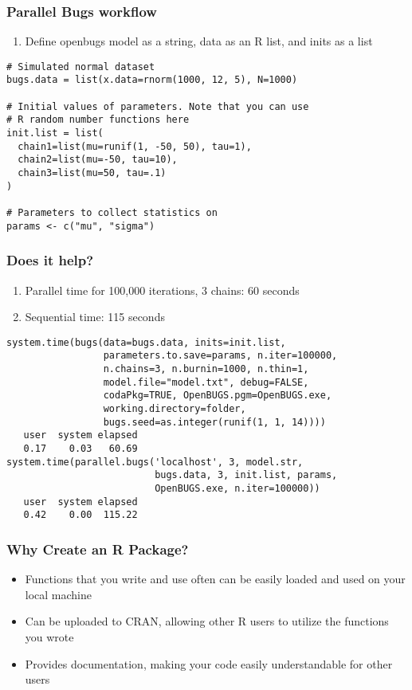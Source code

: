 \documentclass{beamer}
\begin{document}
\begin{frame}[fragile]
  \frametitle{Parallel Bugs workflow}
  
  \begin{enumerate}
    \item Define openbugs model as a string, data as an R list, and inits as a list
  \end{enumerate}

  \begin{verbatim}
# Simulated normal dataset
bugs.data = list(x.data=rnorm(1000, 12, 5), N=1000)

# Initial values of parameters. Note that you can use
# R random number functions here
init.list = list(
  chain1=list(mu=runif(1, -50, 50), tau=1),
  chain2=list(mu=-50, tau=10),
  chain3=list(mu=50, tau=.1)
)

# Parameters to collect statistics on
params <- c("mu", "sigma")
  \end{verbatim}
\end{frame}


\begin{frame}[fragile]
  \frametitle{Does it help?}
  
  \begin{enumerate}
    \item Parallel time for 100,000 iterations, 3 chains: 60 seconds
    \item Sequential time: 115 seconds
  \end{enumerate}

  \begin{verbatim}
system.time(bugs(data=bugs.data, inits=init.list, 
                 parameters.to.save=params, n.iter=100000, 
                 n.chains=3, n.burnin=1000, n.thin=1,
                 model.file="model.txt", debug=FALSE, 
                 codaPkg=TRUE, OpenBUGS.pgm=OpenBUGS.exe,
                 working.directory=folder,
                 bugs.seed=as.integer(runif(1, 1, 14))))
   user  system elapsed 
   0.17    0.03   60.69
system.time(parallel.bugs('localhost', 3, model.str, 
                          bugs.data, 3, init.list, params, 
                          OpenBUGS.exe, n.iter=100000))
   user  system elapsed 
   0.42    0.00  115.22 
  \end{verbatim}
\end{frame}

\begin{frame}
\frametitle{Why Create an R Package?}
\begin{itemize}
    \item Functions that you write and use often can be easily loaded and used on your local machine 
    \item Can be uploaded to CRAN, allowing other R users to utilize the functions you wrote 
    \item Provides documentation, making your code easily understandable for other users
\end{itemize}
\end{frame}
\end{document}
